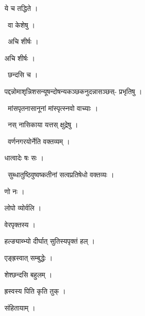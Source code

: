 \documentclass[10pt, openany, oneside]{book}
\begin{document}
\noindent ये च तद्धिते ।

\par\noindent\hspace{1.5em}{\vps वा॰}~{\qt वा केशेषु ।}

\par\noindent\hspace{1.5em}{\vps वा॰}~{\qt अचि शीर्षः ।}

\noindent अचि शीर्षः ।

\par\noindent\hspace{1.5em}{\vps वा॰}~{\qt छन्दसि च ।}

\noindent पद्दन्नोमाश‍ृन्निशसन्यूषन्दोषन्यकञ्छकनुदन्नासञ्छस्- प्रभृतिषु ।

\par\noindent\hspace{1.5em}{\vps वा॰}~{\qt मांसपृतनासानूनां मांस्पृत्स्नवो वाच्याः ।}

\par\noindent\hspace{1.5em}{\vps वा॰}~{\qt नस् नासिकाया यत्तस् क्षुद्रेषु ।}

\par\noindent\hspace{1.5em}{\vps वा॰}~{\qt वर्णनगरयोर्नेति वक्तव्यम् ।}

\noindent धात्वादेः षः सः ।

\par\noindent\hspace{1.5em}{\vps वा॰}~{\qt सुब्धातुष्ठिवुष्वष्कतीनां सत्वप्रतिषेधो वक्तव्यः ।}

\noindent णो नः ।

\noindent लोपो व्योर्वलि ।

\noindent वेरपृक्तस्य ।

\noindent हल्ङ्याब्भ्यो दीर्घात् सुतिस्यपृक्तं हल् ।

\noindent एङ्ह्रस्वात् सम्बुद्धेः ।

\noindent शेश्छन्दसि बहुलम् ।

\noindent ह्रस्वस्य पिति कृति तुक् ।

\noindent संहितायाम् ।
\end{document}
